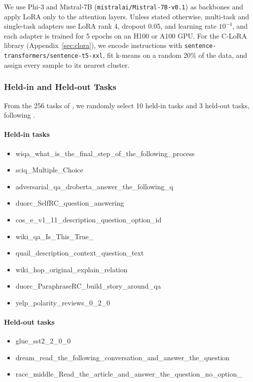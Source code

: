\documentclass[10pt]{article} %
\begin{document}
We use Phi-3 \citep{abdin2024phi} and Mistral-7B (\texttt{mistralai/Mistral-7B-v0.1}) \citep{jiang2023mistral} as backbones and apply LoRA only to the attention layers. Unless stated otherwise, multi-task and single-task adapters use LoRA rank 4, dropout 0.05, and learning rate $10^{-4}$, and each adapter is trained for 5 epochs on an H100 or A100 GPU. For the C-LoRA library (Appendix~\ref{sec:clora}), we encode instructions with \texttt{sentence-transformers/sentence-t5-xxl}, fit k-means on a random 20\% of the data, and assign every sample to its nearest cluster.

\subsubsection{Held-in and Held-out Tasks}
\label{sec:10_held_in}

From the 256 tasks of \citet{ostapenko2024towards}, we randomly select 10 held-in tasks and 3 held-out tasks, following \citet{arnobexploring}.

\paragraph{Held-in tasks}

\begin{itemize}
    \item wiqa\_what\_is\_the\_final\_step\_of\_the\_following\_process
    \item sciq\_Multiple\_Choice
    \item adversarial\_qa\_droberta\_answer\_the\_following\_q
    \item duorc\_SelfRC\_question\_answering
    \item cos\_e\_v1\_11\_description\_question\_option\_id
    \item wiki\_qa\_Is\_This\_True\_
    \item quail\_description\_context\_question\_text
    \item wiki\_hop\_original\_explain\_relation
    \item duorc\_ParaphraseRC\_build\_story\_around\_qa
    \item yelp\_polarity\_reviews\_0\_2\_0
\end{itemize}

\paragraph{Held-out tasks}
\begin{itemize}
    \item glue\_sst2\_2\_0\_0
    \item dream\_read\_the\_following\_conversation\_and\_answer\_the\_question
    \item race\_middle\_Read\_the\_article\_and\_answer\_the\_question\_no\_option\_
\end{itemize}
\end{document}
